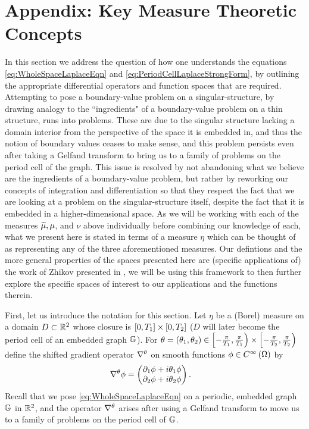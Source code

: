 \section{Appendix: Key Measure Theoretic Concepts} \label{app:MeasureTheory}
In this section we address the question of how one understands the equations \eqref{eq:WholeSpaceLaplaceEqn} and \eqref{eq:PeriodCellLaplaceStrongForm}, by outlining the appropriate differential operators and function spaces that are required.
Attempting to pose a boundary-value problem on a singular-structure, by drawing analogy to the ``ingredients" of a boundary-value problem on a thin structure, runs into problems.
These are due to the singular structure lacking a domain interior from the perspective of the space it is embedded in, and thus the notion of boundary values ceases to make sense, and this problem persists even after taking a Gelfand transform to bring us to a family of problems on the period cell of the graph.
This issue is resolved by not abandoning what we believe are the ingredients of a boundary-value problem, but rather by reworking our concepts of integration and differentiation so that they respect the fact that we are looking at a problem on the singular-structure itself, despite the fact that it is embedded in a higher-dimensional space.
As we will be working with each of the measures $\widetilde{\mu}, \mu$, and $\nu$ above individually before combining our knowledge of each, what we present here is stated in terms of a measure $\eta$ which can be thought of as representing any of the three aforementioned measures.
Our defintions and the more general properties of the spaces presented here are (specific applications of) the work of Zhikov presented in \cite{zhikov2000extension} , we will be using this framework to then further explore the specific spaces of interest to our applications and the functions therein. \newline

First, let us introduce the notation for this section.
Let $\eta$ be a (Borel) measure on a domain $D\subset\mathbb{R}^2$ whose closure is $\left[ 0,T_1 \right]\times\left[ 0,T_2 \right]$ ($D$ will later become the period cell of an embedded graph $\mathbb{G}$).
For $\theta=\left( \theta_1,\theta_2 \right)\in\left[-\frac{\pi}{T_1},\frac{\pi}{T_1}\right)\times\left[-\frac{\pi}{T_2},\frac{\pi}{T_2}\right)$ define the shifted gradient operator $\nabla^{\theta}$ on smooth functions $\phi\in C^{\infty}\left( \Omega \right)$ by
\begin{align*}
	\nabla^{\theta}\phi &= \begin{pmatrix} \partial_1\phi + i\theta_1\phi \\ \partial_2\phi + i\theta_2\phi \end{pmatrix}.
\end{align*}
Recall that we pose \eqref{eq:WholeSpaceLaplaceEqn} on a periodic, embedded graph $\mathbb{G}$ in $\mathbb{R}^2$, and the operator $\nabla^{\theta}$ arises after using a Gelfand transform to move us to a family of problems on the period cell of $\mathbb{G}$. \newline

